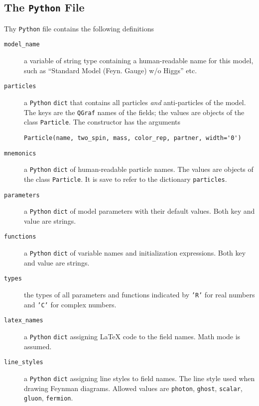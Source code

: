 \documentclass[11pt,a4paper]{refrep}
\newcommand{\qgraf}{{\tt QGraf}\xspace}
\newcommand{\python}{{\tt Python}\xspace}
\begin{document}
\subsection{The \python{} File}
Thy \python{} file contains the following definitions
\begin{description}
\item[\texttt{model\_name}] a variable of string type containing a human-readable
     name for this model, such as ``Standard Model (Feyn. Gauge) w/o Higgs'' etc.
\item[\texttt{particles}] a \python{} \texttt{dict} that contains all particles
     \emph{and} anti-particles of the model. The keys are the \qgraf{} names of the
     fields; the values are objects of the class \texttt{Particle}.
     The constructor has the arguments
     \begin{verbatim}
Particle(name, two_spin, mass, color_rep, partner, width='0')
     \end{verbatim}
\item[\texttt{mnemonics}] a \python{} \texttt{dict} of
     human-readable particle names. The values are objects of the class
     \texttt{Particle}. It is save to refer to the dictionary \texttt{particles}.
\item[\texttt{parameters}] a \python{} \texttt{dict} of
     model parameters with their default values. Both key and value are strings.
\item[\texttt{functions}] a \python{} \texttt{dict} of
     variable names and initialization expressions. Both key and value are strings.
\item[\texttt{types}] the types of all parameters and functions indicated by
     \texttt{'R'} for real numbers and \texttt{'C'} for complex numbers.
\item[\texttt{latex\_names}] a \python{} \texttt{dict} assigning \LaTeX{}
     code to the field names. Math mode is assumed.
\item[\texttt{line\_styles}] a \python{} \texttt{dict} assigning line styles
     to field names. The line style used when drawing Feynman diagrams.
     Allowed values are \texttt{photon}, \texttt{ghost}, \texttt{scalar},
     \texttt{gluon}, \texttt{fermion}.
\end{description}
\end{document}
